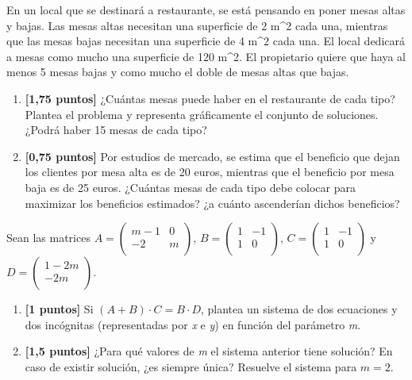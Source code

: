 \documentclass[
]{article}
\providecommand{\tightlist}{%
  \setlength{\itemsep}{0pt}\setlength{\parskip}{0pt}}
\begin{document}
\begin{exercise} En un local que se destinará a restaurante, se está
pensando en poner mesas altas y bajas. Las mesas altas necesitan una
superficie de 2 m\^{}2 cada una, mientras que las mesas bajas necesitan
una superficie de 4 m\^{}2 cada una. El local dedicará a mesas como
mucho una superficie de 120 m\^{}2. El propietario quiere que haya al
menos 5 mesas bajas y como mucho el doble de mesas altas que bajas.

\begin{enumerate}
\def\labelenumi{\alph{enumi})}
\tightlist
\item
  \textbf{{[}1,75 puntos{]}} ¿Cuántas mesas puede haber en el
  restaurante de cada tipo? Plantea el problema y representa
  gráficamente el conjunto de soluciones. ¿Podrá haber 15 mesas de cada
  tipo?
\item
  \textbf{{[}0,75 puntos{]}} Por estudios de mercado, se estima que el
  beneficio que dejan los clientes por mesa alta es de 20 euros,
  mientras que el beneficio por mesa baja es de 25 euros. ¿Cuántas mesas
  de cada tipo debe colocar para maximizar los beneficios estimados? ¿a
  cuánto ascenderían dichos beneficios?
\end{enumerate}

\end{exercise}

\begin{exercise} Sean las matrices
\(A = \begin{pmatrix}  m-1 & 0\\  -2 & m \\ \end{pmatrix}\),
\(B = \begin{pmatrix}  1 & -1\\  1 & 0 \\ \end{pmatrix}\),
\(C = \begin{pmatrix}  1 & -1\\  1 & 0 \\ \end{pmatrix}\) y
\(D = \begin{pmatrix}  1-2m\\  -2m \\ \end{pmatrix}\).

\begin{enumerate}
\def\labelenumi{\alph{enumi})}
\tightlist
\item
  \textbf{{[}1 puntos{]}} Si \((A+B)\cdot C = B \cdot D\), plantea un
  sistema de dos ecuaciones y dos incógnitas (representadas por \emph{x}
  e \emph{y}) en función del parámetro \emph{m}.
\item
  \textbf{{[}1,5 puntos{]}} ¿Para qué valores de \emph{m} el sistema
  anterior tiene solución? En caso de existir solución, ¿es siempre
  única? Resuelve el sistema para \(m = 2\).
\end{enumerate}

\end{exercise}
\end{document}

